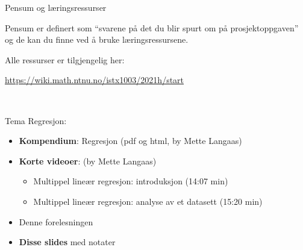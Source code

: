 \documentclass[10pt,ignorenonframetext,]{beamer}
\providecommand{\tightlist}{%
  \setlength{\itemsep}{0pt}\setlength{\parskip}{0pt}}
\begin{document}
\begin{frame}{Pensum og læringsressurser}
\protect\hypertarget{pensum-og-luxe6ringsressurser}{}

Pensum er definert som ``svarene på det du blir spurt om på
prosjektoppgaven'' og de kan du finne ved å bruke læringsressursene.

\vspace{2mm}

Alle ressurser er tilgjengelig her:

\url{https://wiki.math.ntnu.no/istx1003/2021h/start}

\(~\)

Tema Regresjon:

\vspace{2mm}

\begin{itemize}
\item
  \textbf{Kompendium}: Regresjon (pdf og html, by Mette Langaas)
\item
  \textbf{Korte videoer}: (by Mette Langaas)

  \begin{itemize}
  \tightlist
  \item
    Multippel lineær regresjon: introduksjon (14:07 min)
  \item
    Multippel lineær regresjon: analyse av et datasett (15:20 min)
  \end{itemize}
\item
  Denne forelesningen
\item
  \textbf{Disse slides} med notater
\end{itemize}

\end{frame}
\end{document}
